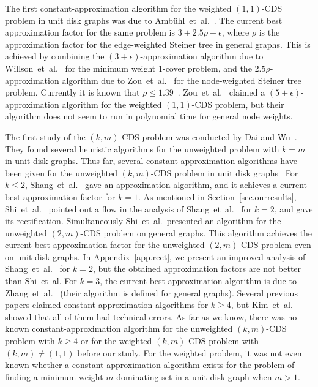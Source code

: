 \documentclass[11pt]{article}
\begin{document}
The first constant-approximation algorithm for
the weighted $(1,1)$-CDS problem in unit disk graphs was due to
Amb{\"{u}}hl~et~al.~\cite{AmbuhlEMN06}.
The current best approximation factor
for the same problem
is
$3+2.5\rho+\epsilon$, where $\rho$ is the approximation factor for the
edge-weighted Steiner tree in general graphs.
 This is achieved by
combining the $(3+\epsilon)$-approximation algorithm
due to Willson~et~al.\ \cite{WillsonZWD15}
for the minimum
weight 1-cover problem, and the $2.5\rho$-approximation
algorithm due to Zou~et~al.\ \cite{ZouLGW09}
for the node-weighted Steiner tree problem.
Currently it is known that $\rho \leq 1.39$~\cite{ByrkaGRS13}.
Zou~et~al.\ \cite{ZouWXLDWW11} claimed a $(5+\epsilon)$-approximation
algorithm for the weighted $(1,1)$-CDS problem, but their algorithm does
not seem to run in polynomial time for general node weights.


The first study of the $(k,m)$-CDS problem
was conducted by Dai and Wu~\cite{Dai:2006}.
They found several heuristic algorithms for the unweighted problem with
$k=m$ in unit disk graphs.
Thus far, several constant-approximation algorithms have been given for the
unweighted $(k,m)$-CDS problem in unit disk graphs~\cite{Shang:2007jg,WangTD09,WangKAGLZW13,Wang:2015}
For $k \leq 2$, Shang~et~al.\ \cite{Shang:2007jg} gave an 
approximation algorithm,
and it achieves a current best approximation factor for $k=1$.
As mentioned in Section~\ref{sec.ourresults},
Shi~et~al.~\cite{ShiZZW16}
pointed out a flow in the analysis of
Shang~et~al.\ \cite{Shang:2007jg} for $k=2$,
and gave its rectification.
Simultaneously Shi~et~al.\ presented an algorithm for the unweighted $(2,m)$-CDS problem on general
graphs. This algorithm achieves the current best approximation factor for
the unweighted $(2,m)$-CDS problem even on
unit disk graphs.
In Appendix~\ref{app.rect},
we present an improved analysis of Shang~et~al.~\cite{Shang:2007jg} for
$k=2$, but the obtained approximation factors are not better than 
Shi~et~al.
For $k=3$,
the current best approximation algorithm is 
due to
Zhang~et~al.\ \cite{Zhang16} (their algorithm is defined for general graphs).
Several previous papers
claimed constant-approximation algorithms for $k\geq 4$, but
Kim~et~al.~\cite{KimWLZW10} showed that
all of them had technical errors.
As far as we know, there was no known constant-approximation algorithm for the
unweighted $(k,m)$-CDS problem with $k\geq 4$ or for
the weighted $(k,m)$-CDS problem with $(k,m)\neq (1,1)$ before our study.
For the weighted problem, it was not even known whether a
constant-approximation algorithm exists for the problem of finding a
minimum weight $m$-dominating set in a unit disk graph when $m > 1$.
\end{document}
